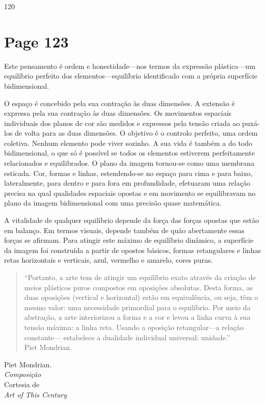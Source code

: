 \documentclass[a4paper]{article}
\begin{document}
120

\newpage
\section*{Page 123}

Este pensamento é ordem e honestidade---nos termos da expressão plástica---um equilíbrio perfeito dos elementos---equilíbrio identificado com a própria superfície bidimensional.

O espaço é concebido pela sua contração às duas dimensões. A extensão é expressa pela sua contração às duas dimensões. Os movimentos espaciais individuais dos planos de cor são medidos e expressos pela tensão criada ao puxá-los de volta para as duas dimensões. O objetivo é o controlo perfeito, uma ordem coletiva. Nenhum elemento pode viver sozinho. A sua vida é também a do todo bidimensional, o que só é possível se todos os elementos estiverem perfeitamente relacionados e equilibrados. O plano da imagem tornou-se como uma membrana esticada. Cor, formas e linhas, estendendo-se no espaço para cima e para baixo, lateralmente, para dentro e para fora em profundidade, efetuaram uma relação precisa na qual qualidades espaciais opostas e em movimento se equilibravam no plano da imagem bidimensional com uma precisão quase matemática.

A vitalidade de qualquer equilíbrio depende da força das forças opostas que estão em balanço. Em termos visuais, depende também de quão abertamente essas forças se afirmam. Para atingir este máximo de equilíbrio dinâmico, a superfície da imagem foi construída a partir de opostos básicos, formas retangulares e linhas retas horizontais e verticais, azul, vermelho e amarelo, cores puras.

\begin{quote}\small
``Portanto, a arte tem de atingir um equilíbrio exato através da criação de meios plásticos puros compostos em oposições absolutas. Desta forma, as duas oposições (vertical e horizontal) estão em equivalência, ou seja, têm o mesmo valor: uma necessidade primordial para o equilíbrio. Por meio da abstração, a arte interiorizou a forma e a cor e levou a linha curva à sua tensão máxima: a linha reta. Usando a oposição retangular---a relação constante--- estabelece a dualidade individual universal: unidade.''\\
Piet Mondrian.
\end{quote}

\small
Piet Mondrian.\\
\textit{Composição}\\
Cortesia de\\
\textit{Art of This Century}
\end{document}
